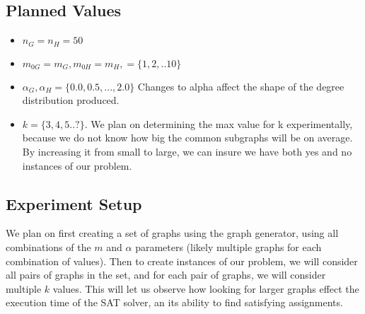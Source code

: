 \documentclass{article}
\begin{document}
\subsection{Planned Values}

\begin{itemize}
  \item $n_G = n_H = 50$ 
  \item $m_{0G} = m_{G}, m_{0H} = m_{H}, = \{1,2,..10\}$ 
  \item $\alpha_G, \alpha_H = \{0.0, 0.5, ..., 2.0\}$ Changes to alpha affect the shape of the degree distribution produced.
  \item $k = \{3, 4, 5 ..  ?\}$. We plan on determining the max value for k experimentally, because we do not know how big the common subgraphs will be on average. By increasing it from small to large, we can insure we have both yes and no instances of our problem.
\end{itemize}



\subsection{Experiment Setup}
We plan on first creating a set of graphs using the graph generator, using all combinations of the $m$ and $\alpha$ parameters (likely multiple graphs for each combination of values). Then to create instances of our problem, we will consider all pairs of graphs in the set, and for each pair of graphs, we will consider multiple $k$ values. This will let us observe how looking for larger graphs effect the execution time of the SAT solver, an its ability to find satisfying assignments.   
\end{document}
